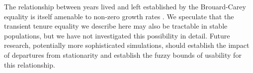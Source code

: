 \documentclass[12pt,oneside,a4paper]{article}
\theoremstyle{definition}
\begin{document}
The relationship between years lived
and left established by the Brouard-Carey equality is itself amenable to non-zero growth rates \citep{riffe2015renewal}.
We speculate that the transient tenure equality we describe here may also be tractable in stable
populations, but we have not investigated this possibility in detail. Future
research, potentially more sophisticated simulations, should establish the
impact of departures from stationarity and establish the fuzzy bounds of
usability for this relationship.



%

  
\end{document}
